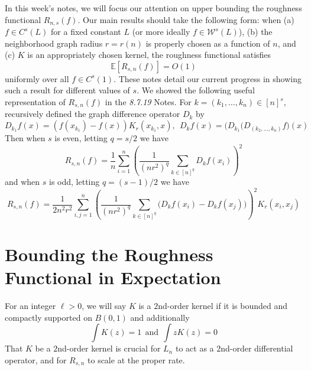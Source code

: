 \documentclass{article}
\newcommand{\1}{\mathbf{1}}
\theoremstyle{alden}
\theoremstyle{aldenthm}
\theoremstyle{definition}
\theoremstyle{remark}
\begin{document}
In this week's notes, we will focus our attention on upper bounding the roughness functional $R_{n,s}(f)$. Our main results should take the following form: when (a) $f \in C^{s}(L)$ for a fixed constant $L$ (or more ideally $f \in \mathcal{W}^{s}(L)$), (b) the neighborhood graph radius $r = r(n)$ is properly chosen as a function of $n$, and (c) $K$ is an appropriately chosen kernel, the roughness functional satisfies
\begin{equation}
\label{eqn:roughness_functional_bound}
\mathbb{E}\left[R_{s,n}(f)\right] = O\left(1\right)
\end{equation}
uniformly over all $f \in C^{s}(1)$. 
These notes detail our current progress in showing such a result for different values of $s$. We showed the following useful representation of $R_{s,n}(f)$ in the \emph{8.7.19} Notes. For $k = (k_1,\ldots,k_n) \in [n]^s$, recursively defined the graph difference operator $D_k$ by 
\begin{equation*}
D_{k_1}f(x) = (f(x_{k_1}) - f(x))K_r(x_{k_1},x),~~ D_kf(x) = \bigl(D_{k_1}(D_{(k_2,\ldots,k_n)}f\bigr)(x)
\end{equation*}
Then when $s$ is even, letting $q = s/2$ we have
\begin{equation}
\label{eqn:roughness_functional_representation_even}
R_{s,n}(f) = \frac{1}{n}\sum_{i = 1}^{n} \left(\frac{1}{(nr^2)^q}\sum_{k \in [n]^q} D_kf(x_i)\right)^2
\end{equation}
and when $s$ is odd, letting $q = (s - 1)/2$ we have
\begin{equation}
\label{eqn:roughness_functional_representation_odd}
R_{s,n}(f) =  \frac{1}{2n^2r^2}\sum_{i,j = 1}^{n}\left(\frac{1}{(nr^2)^q}\sum_{k \in [n]^q}\bigl(D_kf(x_i) - D_kf(x_j)\bigr)\right)^2K_r(x_i,x_j)
\end{equation}

\section{Bounding the Roughness Functional in Expectation}

For an integer $\ell > 0$, we will say $K$ is a $2$nd-order kernel if it is bounded and compactly supported on $B(0,1)$ and additionally
\begin{equation*}
\int K(z) = 1 ~~\textrm{and}~~\int z K(z) = 0
\end{equation*}
That $K$ be a $2$nd-order kernel is crucial for $L_n$ to act as a $2$nd-order differential operator, and for $R_{s,n}$ to scale at the proper rate.
\end{document}

